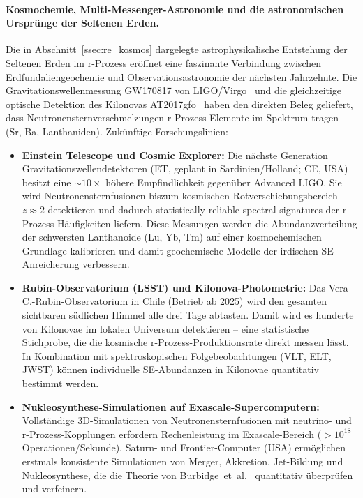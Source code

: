 ﻿\documentclass[12pt, a4paper]{report}
\theoremstyle{definition}
\theoremstyle{remark}
\begin{document}
\paragraph{Kosmochemie, Multi-Messenger-Astronomie und die astronomischen
Ursprünge der Seltenen Erden.}
Die in Abschnitt~\ref{ssec:re_kosmos} dargelegte astrophysikalische Entstehung
der Seltenen Erden im r-Prozess eröffnet eine faszinante Verbindung zwischen
Erdfundaliengeochemie und Observationsastronomie der nächsten Jahrzehnte.
Die Gravitationswellenmessung GW170817 von LIGO/Virgo~\cite{abbott2016} und
die gleichzeitige optische Detektion des Kilonovas AT2017gfo~\cite{smartt2017}
haben den direkten Beleg geliefert, dass Neutronensternverschmelzungen
r-Prozess-Elemente im Spektrum tragen (Sr, Ba, Lanthaniden). Zukünftige
Forschungslinien:

\begin{itemize}
  \item \textbf{Einstein Telescope und Cosmic Explorer:}
    Die nächste Generation Gravitations\-wellendetek\-toren (ET, geplant in
    Sardinien/Holland; CE, USA) besitzt eine $\sim 10\times$ höhere
    Empfindlichkeit gegenüber Advanced LIGO. Sie wird Neutronensternfusionen
    biszum kosmischen Rotverschiebungsbereich $z \approx 2$ detektieren und
    dadurch statistically reliable spectral signatures der r-Prozess-Häufigkeiten
    liefern. Diese Messungen werden die Abundanzverteilung der schwersten
    Lanthanoide (Lu, Yb, Tm) auf einer kosmochemischen Grundlage kalibrieren
    und damit geochemische Modelle der irdischen SE-Anreicherung verbessern.

  \item \textbf{Rubin-Observatorium (LSST) und Kilonova-Photometrie:}
    Das Vera-C.-Rubin-Observatorium in Chile (Betrieb ab 2025) wird den
    gesamten sichtbaren südlichen Himmel alle drei Tage abtasten. Damit
    wird es hunderte von Kilonovae im lokalen Universum detektieren -- eine
    statistische Stichprobe, die die kosmische r-Prozess-Produktionsrate
    direkt messen lässt. In Kombination mit spektroskopischen Folgebeobachtungen
    (VLT, ELT, JWST) können individuelle SE-Abundanzen in Kilo\-novae
    quantitativ bestimmt werden.

  \item \textbf{Nukleosynthese-Simulationen auf Exascale-Supercomputern:}
    Vollständige 3D-Simulationen von Neutronensternfusionen mit neutrino-
    und r-Prozess-Kopplungen erfordern Rechenleistung im Exascale-Bereich
    ($>10^{18}$ Operationen/Sekunde). Saturn- und Frontier-Computer
    (USA) ermöglichen erstmals konsistente Simulationen von Merger, Akkretion,
    Jet-Bildung und Nukleosynthese, die die Theorie von
    Burbidge~et~al.~\cite{burbidge1957} quantitativ überprüfen und verfeinern.


\end{itemize}
\end{document}
